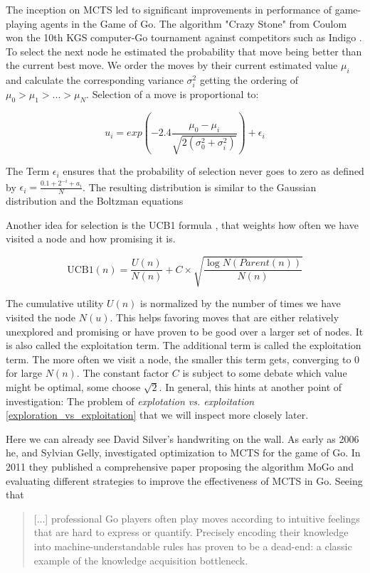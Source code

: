 The inception on MCTS led to significant improvements in performance of game-playing agents in the Game of Go. The algorithm "Crazy Stone" from Coulom won the 10th KGS computer-Go tournament against competitors such as Indigo \cite{bouzy_associating_2006}. To select the next node he estimated the probability that move being better than the current best move. We order the moves by their current estimated value $ \mu_i $ and calculate the corresponding variance $ \sigma_{i}^{2} $ getting the ordering of $ \mu_0 > \mu_1 > ... > \mu_N $. Selection of a move is proportional to:

$$
    u_i = exp\left(-2.4\frac{\mu_0 - \mu_i}{\sqrt{2(\sigma_{0}^{2} + \sigma_{i}^{2})}}\right) + \epsilon_i
$$

The Term $ \epsilon_i $ ensures that the probability of selection never goes to zero as defined by $ \epsilon_i = \frac{0.1 + 2^{-i} + a_i}{N} $. The resulting distribution is similar to the Gaussian distribution and the Boltzman equations \cite{coulom_efficient_2007}

Another idea for selection is the UCB1 formula \cite{auer_finite-time_nodate}, that weights how often we have visited a node and how promising it is.

$$
    \text{UCB1}(n) = \frac{U(n)}{N(n)} + C \times \sqrt{\frac{\log{N(Parent(n))}}{N(n)}}
$$

The cumulative utility $U(n)$ is normalized by the number of times we have visited the node $N(u)$. This helps favoring moves that are either relatively unexplored and promising or have proven to be good over a larger set of nodes. It is also called the exploitation term. The additional term is called the exploitation term. The more often we visit a node, the smaller this term gets, converging to 0 for large $N(n)$. The constant factor $C$ is subject to some debate which value might be optimal, some choose $\sqrt{2}$. In general, this hints at another point of investigation: The problem of \textit{explotation vs. exploitation} \ref{exploration_vs_exploitation} that we will inspect more closely later.

Here we can already see David Silver's handwriting on the wall. As early as 2006 he, and Sylvian Gelly, investigated optimization to MCTS \cite{gelly_achieving_nodate} for the game of Go. In 2011 they published a comprehensive paper \cite{gelly_monte-carlo_2011} proposing the algorithm MoGo and evaluating different strategies to improve the effectiveness of MCTS in Go. Seeing that

\begin{quotation}
    [...] professional Go players often play moves according to intuitive feelings that are hard to express or quantify. Precisely encoding their knowledge into machine-understandable rules has proven to be a dead-end: a classic example of the knowledge acquisition bottleneck.
\end{quotation}

